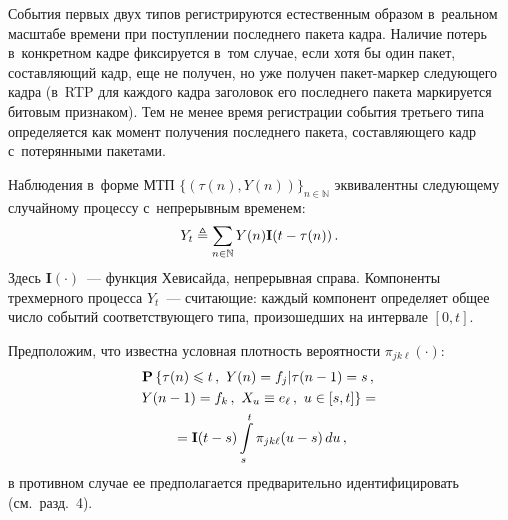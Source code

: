 \begin{multicols}{2}
События первых двух типов регистрируются естественным образом 
в~реальном масштабе времени при поступлении последнего пакета кадра.
Наличие потерь в~конкретном кадре фиксируется в~том случае, если
хотя бы один пакет, со\-став\-ля\-ющий кадр, еще не получен, но уже
получен па\-кет-мар\-кер следующего кадра (в~RTP для каждого кадра
заголовок его последнего пакета маркируется битовым признаком). Тем
не менее время регистрации события третьего типа определяется как
момент получения последнего пакета, составляющего кадр с~потерянными
пакетами.

Наблюдения в~форме МТП $\{(\tau(n),Y(n))\}_{n \in \mathbb{N}}$
эквивалентны следующему случайному процессу с~непрерывным временем:
\begin{equation*}
Y_t \triangleq \sum_{n \in \mathbb{N}}Y(n)\mathbf{I}(t-\tau(n))\,.
\end{equation*}
Здесь $\mathbf{I}(\cdot)$~--- функция Хевисайда, непрерывная справа.
Компоненты трехмерного процесса $Y_t$~--- считающие: каждый
компонент определяет общее число событий соответствующего типа,
произошедших на интервале $[0,t]$.

Предположим, что известна условная плотность вероятности
$\pi_{jk\ell}(\cdot)$:
\begin{multline}
\label{eq:condition_pdfs}
\pc \left\{\tau(n) \leqslant t\,,\ Y(n) = f_j \vert 
\tau(n-1)=s\,,\right.\\
\left.  Y(n-1)=f_k\,,\ 
 X_u \equiv e_{\ell}\,,\  u \in [s,t]\right\}= {}\\
{}=\mathbf{I}(t-s)\int\limits_s^t \pi_{jk\ell}(u-s)\,du\,,
\end{multline}
в противном случае ее предполагается предварительно идентифицировать
(см.\ разд.~4).


\end{multicols}
